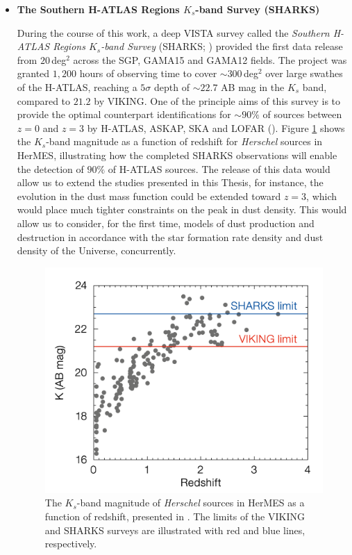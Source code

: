 \begin{itemize}
\item \textbf{The Southern H-ATLAS Regions $K_s$-band Survey (SHARKS)}

During the course of this work, a deep VISTA survey called the \textit{Southern H-ATLAS Regions $K_s$-band Survey} (SHARKS; \citealt{Dannerbauer_2022}) provided the first data release from $20\,$deg$^2$ across the SGP, GAMA15 and GAMA12 fields. The project was granted $1,200$ hours of observing time to cover $\sim 300\,$deg$^2$ over large swathes of the H-ATLAS, reaching a $5\sigma$ depth of $\sim22.7$ AB mag in the $K_s$ band, compared to $21.2$ by VIKING. One of the principle aims of this survey is to provide the optimal counterpart identifications for $\sim90\%$ of sources between $z=0$ and $z=3$ by H-ATLAS, ASKAP, SKA and LOFAR (\citealt{Dannerbauer_2022}). Figure \ref{fig:SHARKS_depth} shows the $K_s$-band magnitude as a function of redshift for \textit{Herschel} sources in HerMES, illustrating how the completed SHARKS observations will enable the detection of $90\%$ of H-ATLAS sources. The release of this data would allow us to extend the studies presented in this Thesis, for instance, the evolution in the dust mass function could be extended toward $z = 3$, which would place much tighter constraints on the peak in dust density. This would allow us to consider, for the first time, models of dust production and destruction in accordance with the star formation rate density and dust density of the Universe, concurrently.

\begin{figure}
    \centering
	\includegraphics[width=0.75\columnwidth]{Figures/SHAKRS_depth.pdf}
	\caption{The $K_s$-band magnitude of \textit{Herschel} sources in HerMES as a function of redshift, presented in \citealt{Dannerbauer_2022}. The limits of the VIKING and SHARKS surveys are illustrated with red and blue lines, respectively.}
	\label{fig:SHARKS_depth}
\end{figure}


\end{itemize}

